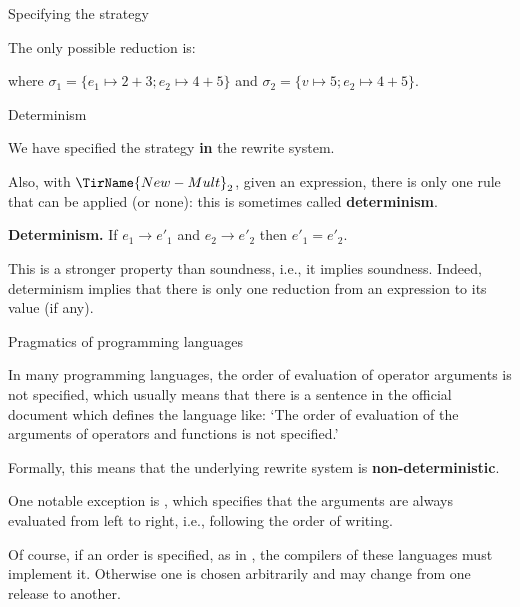 %
\begin{frame}{Specifying the strategy}

  The only possible reduction is:
  where \(\sigma_1=\{e_1 \mapsto 2+3; e_2 \mapsto 4+5\}\) and
  \(\sigma_2=\{v \mapsto 5; e_2 \mapsto 4+5\}\).

\end{frame}

%
\begin{frame}{Determinism}

  We have specified the strategy \textbf{in} the rewrite system.

  \bigskip

  Also, with \(\TirName{New-Mult}_2\), given an expression, there is
  only one rule that can be applied (or none): this is sometimes
  called \textbf{determinism}.

  \bigskip

  \textbf{Determinism.} If \(e_1 \rightarrow e'_1\) and \(e_2
  \rightarrow e'_2\) then \(e'_1 = e'_2\).

  \bigskip

  This is a stronger property than soundness, i.e., it implies
  soundness. Indeed, determinism implies that there is only one
  reduction from an expression to its value (if any).

\end{frame}

%
\begin{frame}{Pragmatics of programming languages}

  In many programming languages, the order of evaluation of operator
  arguments is not specified, which usually means that there is a
  sentence in the official document which defines the language like:
  `The order of evaluation of the arguments of operators and functions
  is not specified.'

  \bigskip

  Formally, this means that the underlying rewrite system is
  \textbf{non-deterministic}.

  \bigskip

  One notable exception is \Java, which specifies that the arguments
  are always evaluated from left to right, i.e., following the order
  of writing.

  \bigskip

  Of course, if an order is specified, as in \Java, the compilers of
  these languages must implement it. Otherwise one is chosen
  arbitrarily and may change from one release to another.

\end{frame}

